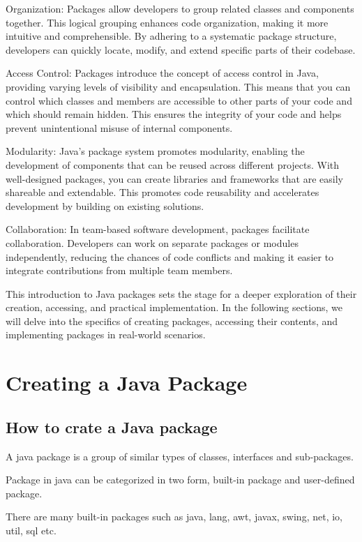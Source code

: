 \documentclass{article}
\begin{document}
Organization: Packages allow developers to group related classes and components together. This logical grouping enhances code organization, making it more intuitive and comprehensible. By adhering to a systematic package structure, developers can quickly locate, modify, and extend specific parts of their codebase.

Access Control: Packages introduce the concept of access control in Java, providing varying levels of visibility and encapsulation. This means that you can control which classes and members are accessible to other parts of your code and which should remain hidden. This ensures the integrity of your code and helps prevent unintentional misuse of internal components.

Modularity: Java's package system promotes modularity, enabling the development of components that can be reused across different projects. With well-designed packages, you can create libraries and frameworks that are easily shareable and extendable. This promotes code reusability and accelerates development by building on existing solutions.

Collaboration: In team-based software development, packages facilitate collaboration. Developers can work on separate packages or modules independently, reducing the chances of code conflicts and making it easier to integrate contributions from multiple team members.

This introduction to Java packages sets the stage for a deeper exploration of their creation, accessing, and practical implementation. In the following sections, we will delve into the specifics of creating packages, accessing their contents, and implementing packages in real-world scenarios.

\section*{Creating a Java Package}

\subsection*{How to crate a Java package}
A java package is a group of similar types of classes, interfaces and sub-packages.

Package in java can be categorized in two form, built-in package and user-defined package.

There are many built-in packages such as java, lang, awt, javax, swing, net, io, util, sql etc.
\end{document}
